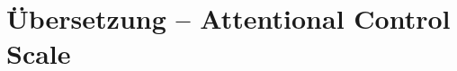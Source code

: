 %
%
\glsresetall

\let\raggedsection\centering 
\chapter{Übersetzung -- Attentional Control Scale}\label{chap.appendix_attentionalControlScale}
\let\raggedsection\raggedright 
